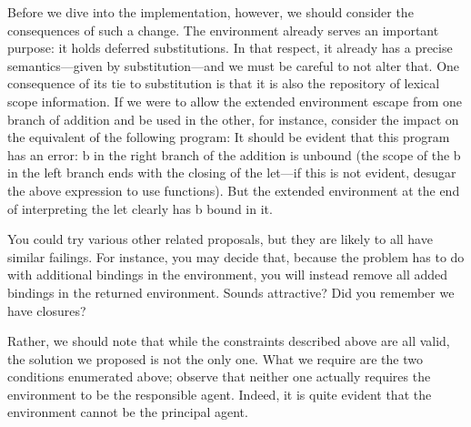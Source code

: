 Before we dive into the implementation, however, we should consider the
consequences of such a change. The environment already serves an important
purpose: it holds deferred substitutions. In that respect, it already has a
precise semantics—given by substitution—and we must be careful to not alter
that. One consequence of its tie to substitution is that it is also the
repository of lexical scope information. If we were to allow the extended
environment escape from one branch of addition and be used in the other, for
instance, consider the impact on the equivalent of the following program:
It should be evident that this program has an error: b in the right branch of
the addition is unbound (the scope of the b in the left branch ends with the
closing of the let—if this is not evident, desugar the above expression to use
functions). But the extended environment at the end of interpreting the let
clearly has b bound in it.

You could try various other related proposals, but they are likely to all have
similar failings. For instance, you may decide that, because the problem has to
do with additional bindings in the environment, you will instead remove all
added bindings in the returned environment. Sounds attractive? Did you remember
we have closures?

Rather, we should note that while the constraints described above are all valid,
the solution we proposed is not the only one. What we require are the two
conditions enumerated above; observe that neither one actually requires the
environment to be the responsible agent. Indeed, it is quite evident that the
environment cannot be the principal agent.

\secup

